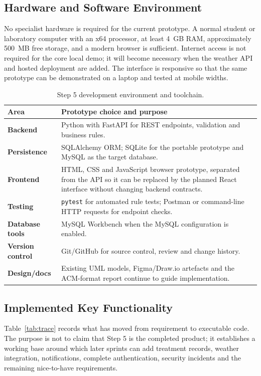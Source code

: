 \documentclass[10pt,twocolumn]{article}
\begin{document}
\subsection{Hardware and Software Environment}
No specialist hardware is required for the current prototype. A normal student or laboratory computer with an x64 processor, at least 4~GB RAM, approximately 500~MB free storage, and a modern browser is sufficient. Internet access is not required for the core local demo; it will become necessary when the weather API and hosted deployment are added. The interface is responsive so that the same prototype can be demonstrated on a laptop and tested at mobile widths.

\begin{table}[ht]
\caption{Step 5 development environment and toolchain.}
\label{tab:stack}
\small
\begin{tabularx}{\columnwidth}{>{\bfseries}p{}X}
\toprule
Area & Prototype choice and purpose \\
\midrule
Backend & Python with FastAPI for REST endpoints, validation and business rules. \\
Persistence & SQLAlchemy ORM; SQLite for the portable prototype and MySQL as the target database. \\
Frontend & HTML, CSS and JavaScript browser prototype, separated from the API so it can be replaced by the planned React interface without changing backend contracts. \\
Testing & \texttt{pytest} for automated rule tests; Postman or command-line HTTP requests for endpoint checks. \\
Database tools & MySQL Workbench when the MySQL configuration is enabled. \\
Version control & Git/GitHub for source control, review and change history. \\
Design/docs & Existing UML models, Figma/Draw.io artefacts and the ACM-format report continue to guide implementation. \\
\bottomrule
\end{tabularx}
\end{table}

\subsection{Implemented Key Functionality}
Table~\ref{tab:trace} records what has moved from requirement to executable code. The purpose is not to claim that Step 5 is the completed product; it establishes a working base around which later sprints can add treatment records, weather integration, notifications, complete authentication, security incidents and the remaining nice-to-have requirements.
\end{document}
